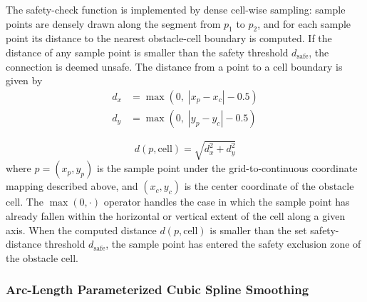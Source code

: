\documentclass[lettersize,journal]{IEEEtran}
\begin{document}
The safety-check function is implemented by dense cell-wise sampling: sample points are densely drawn along the segment from $p_1$ to $p_2$, and for each sample point its distance to the nearest obstacle-cell boundary is computed. If the distance of any sample point is smaller than the safety threshold $d_{\mathrm{safe}}$, the connection is deemed unsafe. The distance from a point to a cell boundary is given by
\begin{equation}
\begin{split}
d_x &= \max\left(0,\; |x_p - x_c| - 0.5\right)\\
d_y &= \max\left(0,\; |y_p - y_c| - 0.5\right)
\end{split}
\label{eq:dxymax}
\end{equation}

\begin{equation}
d(p, \mathrm{cell}) = \sqrt{d_x^2 + d_y^2}
\label{eq:dist}
\end{equation}
where $p = (x_p, y_p)$ is the sample point under the grid-to-continuous coordinate mapping described above, and $(x_c, y_c)$ is the center coordinate of the obstacle cell. The $\max(0, \cdot)$ operator handles the case in which the sample point has already fallen within the horizontal or vertical extent of the cell along a given axis. When the computed distance $d(p, \mathrm{cell})$ is smaller than the set safety-distance threshold $d_{\mathrm{safe}}$, the sample point has entered the safety exclusion zone of the obstacle cell.

\subsubsection{Arc-Length Parameterized Cubic Spline Smoothing}
\end{document}
